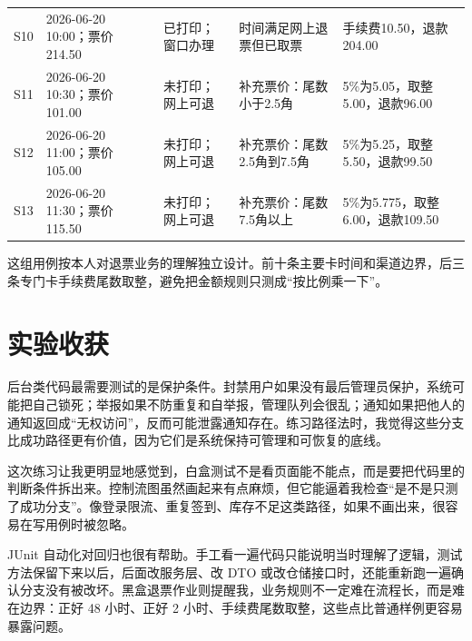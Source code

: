 \documentclass[bwprint]{report}
\begin{document}
{\begin{longtable}{P{1.1cm}P{3.05cm}P{2.25cm}P{3.45cm}P{3.05cm}}
S10 & 2026-\hspace{0pt}06-\hspace{0pt}20 10:00；票价 214.50 & 已打印；窗口办理 & 时间满足网上退票但已取票 & 手续费10.50，退款204.00 \\
S11 & 2026-\hspace{0pt}06-\hspace{0pt}20 10:30；票价 101.00 & 未打印；网上可退 & 补充票价：尾数小于2.5角 & 5\%为5.05，取整5.00，退款96.00 \\
S12 & 2026-\hspace{0pt}06-\hspace{0pt}20 11:00；票价 105.00 & 未打印；网上可退 & 补充票价：尾数2.5角到7.5角 & 5\%为5.25，取整5.50，退款99.50 \\
S13 & 2026-\hspace{0pt}06-\hspace{0pt}20 11:30；票价 115.50 & 未打印；网上可退 & 补充票价：尾数7.5角以上 & 5\%为5.775，取整6.00，退款109.50 \\
\bottomrule
\end{longtable}
}

这组用例按本人对退票业务的理解独立设计。前十条主要卡时间和渠道边界，后三条专门卡手续费尾数取整，避免把金额规则只测成“按比例乘一下”。


\section{实验收获}
后台类代码最需要测试的是保护条件。封禁用户如果没有最后管理员保护，系统可能把自己锁死；举报如果不防重复和自举报，管理队列会很乱；通知如果把他人的通知返回成“无权访问”，反而可能泄露通知存在。练习路径法时，我觉得这些分支比成功路径更有价值，因为它们是系统保持可管理和可恢复的底线。

这次练习让我更明显地感觉到，白盒测试不是看页面能不能点，而是要把代码里的判断条件拆出来。控制流图虽然画起来有点麻烦，但它能逼着我检查“是不是只测了成功分支”。像登录限流、重复签到、库存不足这类路径，如果不画出来，很容易在写用例时被忽略。

JUnit 自动化对回归也很有帮助。手工看一遍代码只能说明当时理解了逻辑，测试方法保留下来以后，后面改服务层、改 DTO 或改仓储接口时，还能重新跑一遍确认分支没有被改坏。黑盒退票作业则提醒我，业务规则不一定难在流程长，而是难在边界：正好 48 小时、正好 2 小时、手续费尾数取整，这些点比普通样例更容易暴露问题。
\end{document}
